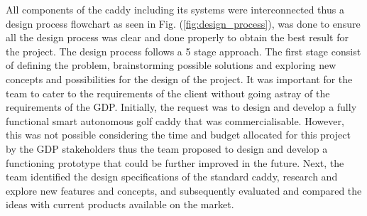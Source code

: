 \documentclass[11pt,landscape]{article}
\begin{document}
\begin{multicols}{3}
All components of the caddy including its systems were interconnected thus a
design process flowchart as seen in Fig. (\ref{fig:design_process}), was done to
ensure all the design process was clear and done properly to obtain the best
result for the project. The design process follows a 5 stage approach. The first
stage consist of defining the problem, brainstorming possible solutions and
exploring new concepts and possibilities for the design of the project. It was
important for the team to cater to the requirements of the client without going
astray of the requirements of the GDP. Initially, the request was to design and
develop a fully functional smart autonomous golf caddy that was
commercialisable. However, this was not possible considering the time and budget
allocated for this project by the GDP stakeholders thus the team proposed to
design and develop a functioning prototype that could be further improved in the
future. Next, the team identified the design specifications of the standard
caddy, research and explore new features and concepts, and subsequently
evaluated and compared the ideas with current products available on the market. 


\end{multicols}
\end{document}
